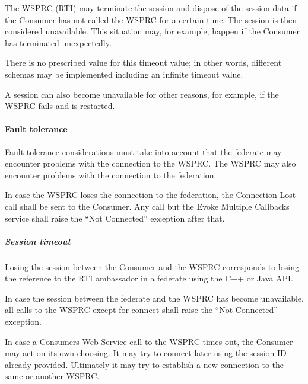 \begin{compactstdpage}
    The WSPRC (RTI) may terminate the session and dispose of the session data if the Consumer has not called the WSPRC for a certain time. The session is then considered unavailable. This situation may, for example, happen if the Consumer has terminated unexpectedly.

    There is no prescribed value for this timeout value; in other words, different schemas may be implemented including an infinite timeout value.

    A session can also become unavailable for other reasons, for example, if the WSPRC fails and is restarted.

    \paragraph{Fault tolerance}

    Fault tolerance considerations must take into account that the federate may encounter problems with the connection to the WSPRC. The WSPRC may also encounter problems with the connection to the federation.

    In case the WSPRC loses the connection to the federation, the Connection Lost \rtiinitiated{} call shall be sent to the Consumer. Any call but the Evoke Multiple Callbacks service shall raise the ``Not Connected'' exception after that.

\end{compactstdpage}

\clearpage

\begin{compactstdpage}
    \subparagraph{Session timeout}

    Losing the session between the Consumer and the WSPRC corresponds to losing the reference to the RTI ambassador in a federate using the C++ or Java API.

    In case the session between the federate and the WSPRC has become unavailable, all calls to the WSPRC except for connect shall raise the ``Not Connected'' exception.

    In case a Consumers Web Service call to the WSPRC times out, the Consumer may act on its own choosing. It may try to connect later using the session ID already provided. Ultimately it may try to establish a new connection to the same or another WSPRC.

\end{compactstdpage}

